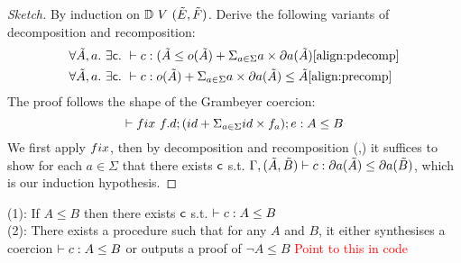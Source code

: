 \documentclass[a4paper,UKenglish,cleveref, autoref, thm-restate]{lipics-v2021}
\newcommand\mycomment[1]{\textcolor{red}{#1}}
\begin{document}
\begin{proof}[Sketch]
By induction on $\mathbb{D}~{V}~(\tilde{E},\tilde{F})$. Derive the following variants of decomposition and recomposition:
\begin{align}
&\forall \tilde{A},a.~\exists \dslcom{c}.~\contains{}{c}{(\tilde{A}}{\myo{\tilde{A}} + \Sigma_{a \in \Sigma} a \times \mypar{a}{\tilde{A}}} \ref{align:pdecomp}\\
&\forall \tilde{A},a.~\exists \dslcom{c}.~\contains{}{c}
{\myo{\tilde{A}} + \Sigma_{a \in \Sigma} a \times \mypar{a}{\tilde{A}}}
{\tilde{A}} \ref{align:precomp}
\end{align}
The proof follows the shape of the Grambeyer coercion:
\[\contains{}{\fix ~f.d;(id + \Sigma_{a \in \Sigma} id\times f_a); e}{A}{B}\]
We first apply $\fix$, then by decomposition and recomposition (\label{align:pdecomp},\label{align:precomp}) it suffices to show for each $a \in \Sigma$ that there exists $\textsf{c}$ s.t. $\contains{\Gamma,\pder{A}{B}}{c}{\mypar{a}{\tilde{A}}}{\mypar{a}{\tilde{B}}}$, which is our induction hypothesis.
\end{proof}
\begin{corollary}
(1): If $A \leq B$ then there exists $\textsf{c}$ s.t. $\contains{}{c}{A}{B}$\\
(2): There exists a procedure such that for any $A$ and $B$, it either synthesises a coercion $\contains{}{c}{A}{B}$ or outputs a proof of $\lnot A \leq B $ \mycomment{Point to this in code}
\end{corollary}





\end{document}
